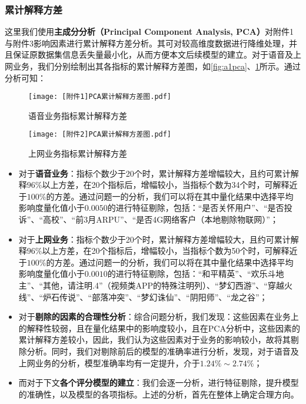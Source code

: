 \documentclass{MathorCupmodeling}
\begin{document}
	\subsubsection{累计解释方差}
	这里我们使用\textbf{主成分分析（Principal Component Analysis, PCA）}对附件1与附件3影响因素进行累计解释方差分析。其可对较高维度数据进行降维处理，并且保证原数据集信息丢失量最小化\textcolor{blue}{\cite{ppca}}，从而方便本文后续模型的建立。对于语音及上网业务，我们分别绘制出其各指标的累计解释方差图，如\textcolor{blue}{\cref{fig:a1pca}}、\textcolor{blue}{\cref{fig:a2pca}}所示。通过分析可知：
	\begin{figure}[htbp]
		\centering
		\begin{minipage}{0.48\linewidth}
			\centering
			\texttt{[image: [附件1]PCA累计解释方差图.pdf]}
			\caption{语音业务指标累计解释方差}
			\label{fig:a1pca}
		\end{minipage}
		\begin{minipage}{0.48\linewidth}
			\centering
			\texttt{[image: [附件2]PCA累计解释方差图.pdf]}
			\caption{上网业务指标累计解释方差}
			\label{fig:a2pca}
		\end{minipage}
	\end{figure}
	\begin{itemize}
		\item 对于\textbf{语音业务}：指标个数少于20个时，累计解释方差增幅较大，且约可累计解释$96\%$以上方差，在20个指标后，增幅较小，当指标个数为34个时，可解释近于$100\%$的方差。通过问题一的分析，我们可以将在其中量化结果中选择平均影响度量化值小于$0.0050$的进行特征剔除，包括：“是否关怀用户”、“是否投诉”、“高校”、“前3月ARPU”、“是否4G网络客户（本地剔除物联网）”；
		\item 对于\textbf{上网业务}：指标个数少于20个时，累计解释方差增幅较大，且约可累计解释$96\%$以上方差，在20个指标后，增幅较小，当指标个数为50个时，可解释近于$100\%$的方差。通过问题一的分析，我们可以将在其中量化结果中选择平均影响度量化值小于$0.0010$的进行特征剔除，包括：“和平精英”、“欢乐斗地主”、“其他，请注明.4”（视频类APP的特殊注明列）、“梦幻西游”、“穿越火线”、“炉石传说”、“部落冲突”、“梦幻诛仙”、“阴阳师”、“龙之谷”；
		\item 对于\textbf{剔除的因素的合理性分析}：综合问题分析，我们发现：这些因素在业务上的解释性较弱，且在量化结果中的影响度较小，且在PCA分析中，这些因素的累计解释方差较小，因此，我们认为这些因素对于业务的影响较小，故将其剔除分析。同时，我们对剔除前后的模型的准确率进行分析，发现，对于语音及上网业务的分析，模型准确率均有一定提升，介于$1.24\%\sim2.74\%$；
		\item 而对于下文\textbf{各个评分模型的建立}：我们会逐一分析，进行特征剔除，提升模型的准确性，以及模型的各项指标。上述的分析，首先在整体上确定合理方向。
	\end{itemize}
\end{document}
